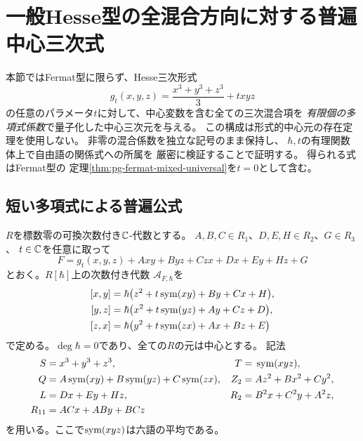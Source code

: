 \section{一般Hesse型の全混合方向に対する普遍中心三次式}
\label{sec:pg-hesse-mixed-universal}
本節ではFermat型に限らず、Hesse三次形式
\begin{equation}
 g_t(x,y,z)=\frac{x^3+y^3+z^3}{3}+txyz
\end{equation}
の任意のパラメータ$t$に対して、中心変数を含む全ての三次混合項を
\emph{有限個の多項式係数}で量子化した中心三次元を与える。
この構成は形式的中心元の存在定理を使用しない。
非零の混合係数を独立な記号のまま保持し、
$\hbar,t$の有理関数体上で自由語の関係式への所属を
厳密に検証することで証明する。
得られる式はFermat型の
定理\ref{thm:pg-fermat-mixed-universal}を$t=0$として含む。

\subsection{短い多項式による普遍公式}
$R$を標数零の可換次数付き$\mathbb C$-代数とする。
$A,B,C\in R_1$、$D,E,H\in R_2$、$G\in R_3$、
$t\in\mathbb C$を任意に取って
\begin{equation}
 F=g_t(x,y,z)+Axy+Byz+Czx+Dx+Ey+Hz+G
 \label{eq:pg-hm-F}
\end{equation}
とおく。$R[\hbar]$上の次数付き代数
$\mathcal A_{F,\hbar}$を
\begin{equation}
\begin{aligned}
 [x,y]&=\hbar\bigl(z^2+t\sym(xy)+By+Cx+H\bigr),\\
 [y,z]&=\hbar\bigl(x^2+t\sym(yz)+Ay+Cz+D\bigr),\\
 [z,x]&=\hbar\bigl(y^2+t\sym(zx)+Ax+Bz+E\bigr)
\end{aligned}
\label{eq:pg-hm-rel}
\end{equation}
で定める。$\deg\hbar=0$であり、全ての$R$の元は中心とする。
記法
\begin{equation}
\begin{aligned}
 S={}&x^3+y^3+z^3,&
 T={}&\operatorname{sym}(xyz),\\
 Q={}&A\operatorname{sym}(xy)+B\operatorname{sym}(yz)+C\operatorname{sym}(zx),&
 Z_2={}&Az^2+Bx^2+Cy^2,\\
 L={}&Dx+Ey+Hz,&
 R_2={}&B^2x+C^2y+A^2z,\\
 R_{11}={}&ACx+ABy+BCz
\end{aligned}
\end{equation}
を用いる。ここで$\operatorname{sym}(xyz)$は六語の平均である。

